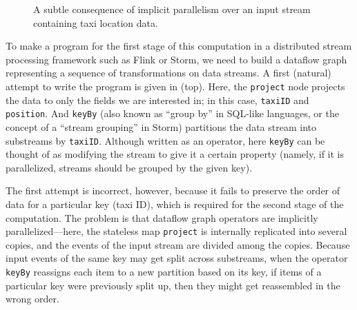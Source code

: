 \begin{figure}[tb]
\centering
{}

\smallskip


\caption[DiffStream example use case 1.]{A subtle consequence of implicit parallelism
over an input stream containing taxi location data.
}
\label{diffstream:ex:overview-simple}
\end{figure}

To make a program for the first stage of this computation in a distributed stream processing framework such as Flink or Storm, we need to build a dataflow graph representing a sequence of transformations on data streams. A first (natural) attempt to write the program is given in  (top). Here, the \texttt{project} node projects the data to only the fields we are interested in; in this case, \texttt{taxiID} and \texttt{position}. And \texttt{keyBy} (also known as ``group by'' in SQL-like languages, or the concept of a ``stream grouping'' in Storm) partitions the data stream into substreams by \texttt{taxiID}.
Although written as an operator, here \texttt{keyBy} can be thought of as modifying the stream to give it a certain property (namely, if it is parallelized, streams should be grouped by the given key).

The first attempt is incorrect, however, because it fails to preserve
the order of data for a particular key (taxi ID), which is required
for the second stage of the computation. The problem is that dataflow
graph operators are implicitly parallelized---here, the stateless map
\texttt{project} is internally replicated into several copies, and the
events of the input stream are divided among the copies.
Because input events of the same key may get split across substreams,
when the operator \texttt{keyBy} reassigns each item to a new
partition based on its key, if items of a particular key were
previously split up, then they might get reassembled in the wrong
order.

